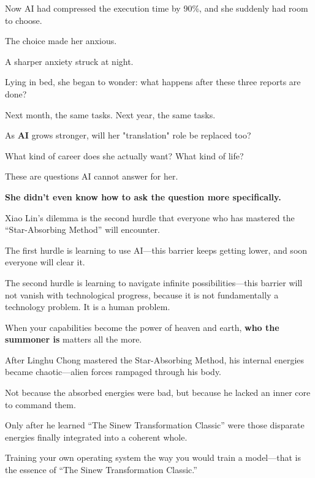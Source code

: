 Now AI had compressed the execution time by 90\%, and she suddenly had room to choose.

The choice made her anxious.

\vspace{1em}

A sharper anxiety struck at night.

Lying in bed, she began to wonder: what happens after these three reports are done?

Next month, the same tasks. Next year, the same tasks.

As \textbf{AI} grows stronger, will her "translation" role be replaced too?

What kind of career does she actually want? What kind of life?

These are questions AI cannot answer for her.

\textbf{She didn't even know how to ask the question more specifically.}

\vspace{1em}

Xiao Lin's dilemma is the second hurdle that everyone who has mastered the ``Star-Absorbing Method'' will encounter.

The first hurdle is learning to use AI---this barrier keeps getting lower, and soon everyone will clear it.

The second hurdle is learning to navigate infinite possibilities---this barrier will not vanish with technological progress, because it is not fundamentally a technology problem. It is a human problem.

When your capabilities become the power of heaven and earth, \textbf{who the summoner is} matters all the more.

\vspace{1em}

After Linghu Chong mastered the Star-Absorbing Method, his internal energies became chaotic---alien forces rampaged through his body.

Not because the absorbed energies were bad, but because he lacked an inner core to command them.

Only after he learned ``The Sinew Transformation Classic'' were those disparate energies finally integrated into a coherent whole.

\vspace{1em}

Training your own operating system the way you would train a model---that is the essence of ``The Sinew Transformation Classic.''

